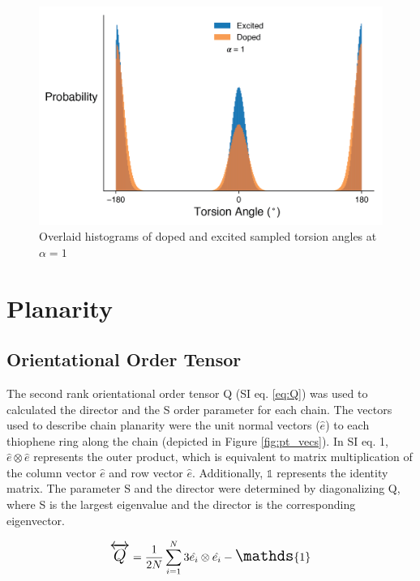 \begin{figure}[hbt!]
    \centering
    \includegraphics{figures/append_tor_model/a_1_hist.png}
    \caption{Overlaid histograms of doped and excited sampled torsion angles at $\alpha = 1$}
    \label{fig:a_1_hist}
\end{figure}

\clearpage
\section{Planarity}
\label{sec:planarity}
\subsection{Orientational Order Tensor}

The second rank orientational order tensor Q (SI eq. \ref{eq:Q}) was used to calculated the director and the S order parameter for each chain. The vectors used to describe chain planarity were the unit normal vectors ($\hat{e}$) to each thiophene ring along the chain (depicted in Figure \ref{fig:pt_vecs}). In SI eq. 1, $\hat{e} \otimes \hat{e}$ represents the outer product, which is equivalent to matrix multiplication of the column vector $\hat{e}$ and row vector $\hat{e}$. Additionally, $\mathds{1}$ represents the identity matrix. The parameter S and the director were determined by diagonalizing Q, where S is the largest eigenvalue and the director is the corresponding eigenvector.\cite{Allen2017}

\begin{equation}
\Large
\overleftrightarrow{Q} = \frac{1}{2N} \sum_{i=1}^{N} 3\hat{e_i} \otimes \hat{e_i} - \mathds{1}
\label{eq:Q}
\end{equation}
